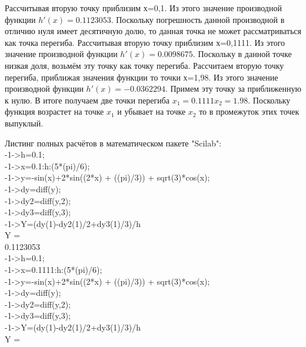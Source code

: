 \documentclass[russian,utf8,nocolumnxxxi,nocolumnxxxii]{eskdtext}
\begin{document}
Рассчитывая вторую точку приблизим х=0,1. Из этого значение производной функции $h'(x)=0.1123053$. Поскольку погрешность данной производной в отличию нуля имеет десятичную долю, то данная точка не может рассматриваться как точка перегиба. Рассчитывая вторую точку приблизим х=0,1111. Из этого значение производной функции $h'(x)=0.0098675$. Поскольку в данной точке низкая доля, возьмём эту точку как точку перегиба. Рассчитаем вторую точку перегиба, приближая значения функции то точки х=1,98. Из этого значение производной функции $h'(x)=- 0.0362294$. Примем эту точку за приближенную к нулю. В итоге получаем две точки перегиба $x_1=0.1111 x_2=1.98$. Поскольку функция возрастет на точке $x_1$ и убывает на точке $x_2$ то в промежуток этих точек выпуклый.

Листинг полных расчётов в математическом пакете "Scilab":\\

-1->h=0.1;\\

-1->x=0.1:h:(5*(pi)/6);\\

-1->y=-sin(x)+2*sin((2*x) + ((pi)/3)) + sqrt(3)*cos(x);\\



-1->dy=diff(y);\\

-1->dy2=diff(y,2);\\

-1->dy3=diff(y,3);\\

-1->Y=(dy(1)-dy2(1)/2+dy3(1)/3)/h\\
 Y  =\\

    0.1123053  \\

-1->h=0.1;\\

-1->x=0.1111:h:(5*(pi)/6);\\

-1->y=-sin(x)+2*sin((2*x) + ((pi)/3)) + sqrt(3)*cos(x);\\

-1->dy=diff(y);\\

-1->dy2=diff(y,2);\\

-1->dy3=diff(y,3);\\


-1->Y=(dy(1)-dy2(1)/2+dy3(1)/3)/h\\
 Y  =\\
\end{document}
